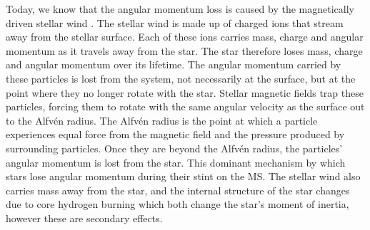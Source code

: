 Today, we know that the angular momentum loss is caused by the magnetically
driven stellar wind \citep{Schatzman1962, Weber1967, Mestel1984}.
The stellar wind is made up of charged ions that stream away from the stellar
surface.
Each of these ions carries mass, charge and angular momentum as it travels
away from the star.
The star therefore loses mass, charge and angular momentum over its lifetime.
The angular momentum carried by these particles is lost from the system, not
necessarily at the surface, but at the point where they no longer rotate with
the star.
Stellar magnetic fields trap these particles, forcing them to rotate with the
same angular velocity as the surface out to the Alfv{\'e}n radius.
The Alfv{\'e}n radius is the point at which a particle experiences equal force
from the magnetic field and the pressure produced by surrounding particles.
Once they are beyond the Alfv{\'e}n radius, the particles' angular momentum is
lost from the star.
This dominant mechanism by which stars lose angular momentum during their
stint on the MS.
The stellar wind also carries mass away from the star, and the internal
structure of the star changes due to core hydrogen burning which both change
the star's moment of inertia, however these are secondary effects.

